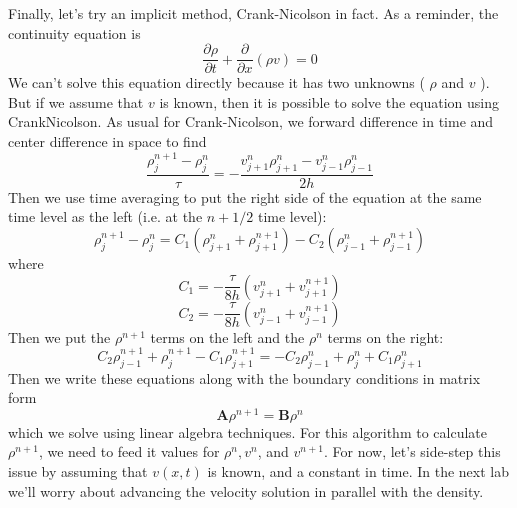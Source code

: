 Finally, let\rq s try an implicit method, Crank-Nicolson in fact. As a reminder, the
continuity equation is
\begin{equation}\label{eq:1012}
\frac{\partial \rho}{\partial t}+\frac{\partial}{\partial x}(\rho v)=0
\end{equation}
We can\rq t solve this equation directly because it has two unknowns ( $\rho$ and $v$ ). But if we assume that $v$ is known, then it is possible to solve the equation using CrankNicolson. As usual for Crank-Nicolson, we forward difference in time and center difference in space to find
\begin{equation}\label{eq:1013}
\frac{\rho_{j}^{n+1}-\rho_{j}^{n}}{\tau}=-\frac{v_{j+1}^{n} \rho_{j+1}^{n}-v_{j-1}^{n} \rho_{j-1}^{n}}{2 h}
\end{equation}
Then we use time averaging to put the right side of the equation at the same time
level as the left (i.e. at the $n + 1/2$ time level):
\begin{equation}\label{eq:1014}
\rho_{j}^{n+1}-\rho_{j}^{n}=C_{1}\left(\rho_{j+1}^{n}+\rho_{j+1}^{n+1}\right)-C_{2}\left(\rho_{j-1}^{n}+\rho_{j-1}^{n+1}\right)
\end{equation}
where 
\begin{equation}\label{eq:1015}
C_{1}=-\frac{\tau}{8 h}\left(v_{j+1}^{n}+v_{j+1}^{n+1}\right)
\end{equation}
\begin{equation}\label{eq:1016}
C_{2}=-\frac{\tau}{8 h}\left(v_{j-1}^{n}+v_{j-1}^{n+1}\right)
\end{equation}
Then we put the $\rho^{n+1}$ terms on the left and the $\rho^n$ terms on the right:
\begin{equation}\label{eq:1017}
C_{2} \rho_{j-1}^{n+1}+\rho_{j}^{n+1}-C_{1} \rho_{j+1}^{n+1}=-C_{2} \rho_{j-1}^{n}+\rho_{j}^{n}+C_{1} \rho_{j+1}^{n}
\end{equation}
Then we write these equations along with the boundary conditions in matrix form
\begin{equation}\label{eq:1018}
\mathbf{A} \rho^{n+1}=\mathbf{B} \rho^{n}
\end{equation}
which we solve using linear algebra techniques. For this algorithm to calculate $\rho^{n+1}$, we need to feed it values for $\rho^{n}, v^{n}$, and $v^{n+1}$. For now, let\rq s side-step this issue by assuming that $v(x, t)$ is known, and a constant in time. In the next lab we\rq ll worry about advancing the velocity solution in parallel with the density.

